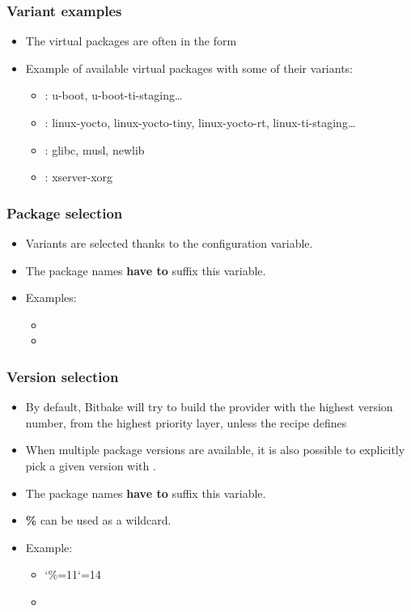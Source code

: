 \begin{frame}
  \frametitle{Variant examples}
  \begin{itemize}
    \item The virtual packages are often in the form
    \item Example of available virtual packages with some of their
      variants:
      \begin{itemize}
        \item {}: u-boot,
          u-boot-ti-staging\dots
        \item {}: linux-yocto, linux-yocto-tiny,
          linux-yocto-rt, linux-ti-staging\dots
        \item {}: glibc, musl, newlib
        \item {}: xserver-xorg
      \end{itemize}
  \end{itemize}
\end{frame}

\begin{frame}
  \frametitle{Package selection}
  \begin{itemize}
    \item Variants are selected thanks to the
       configuration variable.
    \item The package names {\bf have to} suffix this variable.
    \item Examples:
    \begin{itemize}
      \item {}
      \item {}
    \end{itemize}
  \end{itemize}
\end{frame}

\begin{frame}
  \frametitle{Version selection}
  \begin{itemize}
    \item By default, Bitbake will try to build the provider with the
      highest version number, from the highest priority layer, unless the recipe defines
    \item When multiple package versions are available, it is also
      possible to explicitly pick a given version with
      .
    \item The package names {\bf have to} suffix this variable.
    \item {\bf \%} can be used as a wildcard.
    \item Example:
    \begin{itemize}
      \item \catcode`\%=11\catcode`\@=14
      \item {}
    \end{itemize}
  \end{itemize}
\end{frame}

